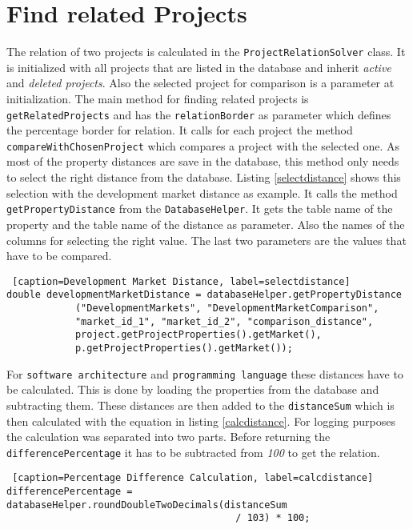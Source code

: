 \section{Find related Projects}

The relation of two projects is calculated in the \texttt{ProjectRelationSolver} class. It is initialized with all projects that are listed in the database and inherit \textit{active} and \textit{deleted projects}. Also the selected project for comparison is a parameter at initialization. The main method for finding related projects is \texttt{getRelatedProjects} and has the \texttt{relationBorder} as parameter which defines the percentage border for relation. It calls for each project the method \texttt{compareWithChosenProject} which compares a project with the selected one. As most of the property distances are save in the database, this method only needs to select the right distance from the database. Listing \ref{selectdistance} shows this selection with the development market distance as example. It calls the method \texttt{getPropertyDistance} from the \texttt{DatabaseHelper}. It gets the table name of the property and the table name of the distance as parameter. Also the names of the columns for selecting the right value. The last two parameters are the values that have to be compared.
\begin{lstlisting} [caption=Development Market Distance, label=selectdistance] 
double developmentMarketDistance = databaseHelper.getPropertyDistance
			("DevelopmentMarkets", "DevelopmentMarketComparison", 
			"market_id_1", "market_id_2", "comparison_distance",
			project.getProjectProperties().getMarket(),
		    p.getProjectProperties().getMarket());

\end{lstlisting}
For \texttt{software architecture} and \texttt{programming language} these distances have to be calculated. This is done by loading the properties from the database and subtracting them. These distances are then added to the \texttt{distanceSum} which is then calculated with the equation in listing \ref{calcdistance}. For logging purposes the calculation was separated into two parts. Before returning the \texttt{differencePercentage} it has to be subtracted from \textit{100} to get the relation.
\begin{lstlisting} [caption=Percentage Difference Calculation, label=calcdistance] 
differencePercentage = databaseHelper.roundDoubleTwoDecimals(distanceSum 
										/ 103) * 100;
\end{lstlisting}

